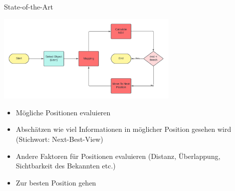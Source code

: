 \documentclass{beamer}
\begin{document}
\begin{frame}{State-of-the-Art}
	\begin{center}
		\includegraphics[width=0.65\textwidth]{Graphics/flow_chart.png}
	\end{center}

	\begin{block}{}
		\begin{itemize}
			\item Mögliche Positionen evaluieren
			\item Abschätzen wie viel Informationen in möglicher Position gesehen wird (Stichwort: Next-Best-View)
			\item Andere Faktoren für Positionen evaluieren (Distanz, Überlappung, Sichtbarkeit des Bekannten etc.)
			\item Zur besten Position gehen
		\end{itemize}
	\end{block}
\end{frame}
\end{document}
